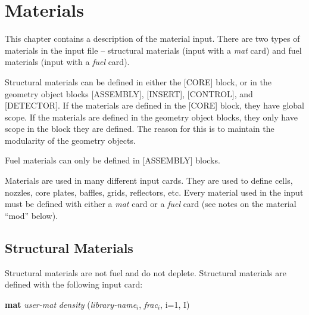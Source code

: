 %
%
\section{Materials}  \label{chap:materials}

This chapter contains a description of the material input.  There are two types of materials
in the input file -- structural materials (input with a {\it mat} card) and fuel materials
(input with a {\it fuel} card).

Structural materials can be defined in either the [CORE] block, or in the
geometry object blocks [ASSEMBLY], [INSERT], [CONTROL], and [DETECTOR].
If the materials are defined in the [CORE] block, they have global scope.
If the materials are defined in the geometry object blocks, they only have
scope in the block they are defined.
The reason for this is to maintain the modularity of the geometry objects.

Fuel materials can only be defined in [ASSEMBLY] blocks.

Materials are used in many different input cards.  They are used to define
cells, nozzles, core plates, baffles, grids, reflectors, etc.  Every material
used in the input must be defined with either a {\it mat} card or a {\it fuel} card
(see notes on the material ``mod'' below).

\subsection{Structural Materials}

Structural materials are not fuel and do not deplete.  Structural
materials are defined with the following input card:

{\bf mat} {\it user-mat} {\it density} ({\it library-name$_i$}, {\it frac$_i$}, i=1, I)

